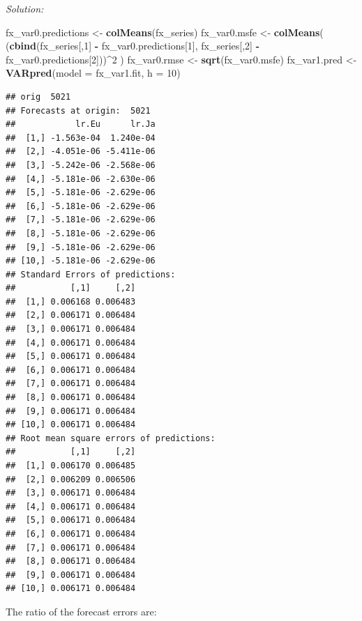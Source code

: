 \documentclass[12pt,a4paper]{article}
\newenvironment{Shaded}{\begin{snugshade}}{\end{snugshade}}
\newcommand{\DataTypeTok}[1]{\textcolor[rgb]{0.13,0.29,0.53}{#1}}
\newcommand{\DecValTok}[1]{\textcolor[rgb]{0.00,0.00,0.81}{#1}}
\newcommand{\KeywordTok}[1]{\textcolor[rgb]{0.13,0.29,0.53}{\textbf{#1}}}
\newcommand{\NormalTok}[1]{#1}
\newcommand{\OperatorTok}[1]{\textcolor[rgb]{0.81,0.36,0.00}{\textbf{#1}}}
\newcommand{\OtherTok}[1]{\textcolor[rgb]{0.56,0.35,0.01}{#1}}
\newcommand{\StringTok}[1]{\textcolor[rgb]{0.31,0.60,0.02}{#1}}
\begin{document}
\emph{Solution:}

\begin{Shaded}
\begin{Highlighting}[]
\NormalTok{fx_var0.predictions <-}\StringTok{ }\KeywordTok{colMeans}\NormalTok{(fx_series) }
\NormalTok{fx_var0.msfe <-}\StringTok{ }\KeywordTok{colMeans}\NormalTok{( (}\KeywordTok{cbind}\NormalTok{(fx_series[,}\DecValTok{1}\NormalTok{] }\OperatorTok{-}\StringTok{ }\NormalTok{fx_var0.predictions[}\DecValTok{1}\NormalTok{], fx_series[,}\DecValTok{2}\NormalTok{] }\OperatorTok{-}\StringTok{ }\NormalTok{fx_var0.predictions[}\DecValTok{2}\NormalTok{]))}\OperatorTok{^}\DecValTok{2}\NormalTok{ )}
\NormalTok{fx_var0.rmse <-}\StringTok{ }\KeywordTok{sqrt}\NormalTok{(fx_var0.msfe)}
\NormalTok{fx_var1.pred <-}\StringTok{ }\KeywordTok{VARpred}\NormalTok{(}\DataTypeTok{model =}\NormalTok{ fx_var1.fit, }\DataTypeTok{h =} \DecValTok{10}\NormalTok{)}
\end{Highlighting}
\end{Shaded}

\begin{verbatim}
## orig  5021 
## Forecasts at origin:  5021 
##            lr.Eu      lr.Ja
##  [1,] -1.563e-04  1.240e-04
##  [2,] -4.051e-06 -5.411e-06
##  [3,] -5.242e-06 -2.568e-06
##  [4,] -5.181e-06 -2.630e-06
##  [5,] -5.181e-06 -2.629e-06
##  [6,] -5.181e-06 -2.629e-06
##  [7,] -5.181e-06 -2.629e-06
##  [8,] -5.181e-06 -2.629e-06
##  [9,] -5.181e-06 -2.629e-06
## [10,] -5.181e-06 -2.629e-06
## Standard Errors of predictions:  
##           [,1]     [,2]
##  [1,] 0.006168 0.006483
##  [2,] 0.006171 0.006484
##  [3,] 0.006171 0.006484
##  [4,] 0.006171 0.006484
##  [5,] 0.006171 0.006484
##  [6,] 0.006171 0.006484
##  [7,] 0.006171 0.006484
##  [8,] 0.006171 0.006484
##  [9,] 0.006171 0.006484
## [10,] 0.006171 0.006484
## Root mean square errors of predictions:  
##           [,1]     [,2]
##  [1,] 0.006170 0.006485
##  [2,] 0.006209 0.006506
##  [3,] 0.006171 0.006484
##  [4,] 0.006171 0.006484
##  [5,] 0.006171 0.006484
##  [6,] 0.006171 0.006484
##  [7,] 0.006171 0.006484
##  [8,] 0.006171 0.006484
##  [9,] 0.006171 0.006484
## [10,] 0.006171 0.006484
\end{verbatim}

The ratio of the forecast errors are:

\begin{Shaded}
\end{Shaded}
\end{document}
